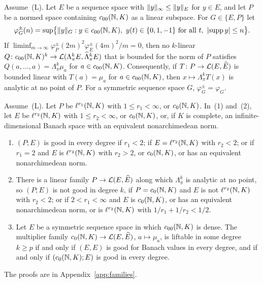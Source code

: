 \begin{theorem}\label{fam2:thm:staircase}
Assume~\textup{(L)}. Let $E$ be a sequence space with $\lVert y\rVert_\infty\le\lVert y\rVert_E$ for $y\in E$, and let $P$ be a normed
space containing $c_{00}(\mathbb N,K)$ as a linear subspace. For $G\in\{E,P\}$ let
\[
 \varphi^\pm_G(n)=\sup\bigl\{\lVert y\rVert_G:y\in c_{00}(\mathbb N,K),\ y(t)\in\{0,1,-1\}\text{ for all }t,\
 \lvert \operatorname{supp}y\rvert\le n\bigr\}.
\]
If $\liminf_{m\to\infty}\varphi^\pm_P(2m)^2\varphi^\pm_E(4m)^2/m=0$, then no $k$-linear
$Q\colon c_{00}(\mathbb N,K)^k\to\mathcal L(\Lambda^k_\pi E,\widehat\Lambda^k_\pi E)$ that is bounded for the norm of $P$ satisfies
$Q(a,\dots,a)=\Lambda^k_\pi\mu_a$ for $a\in c_{00}(\mathbb N,K)$. Consequently, if $T\colon P\to\mathcal L(E,\widehat E)$ is bounded
linear with $T(a)=\mu_a$ for $a\in c_{00}(\mathbb N,K)$, then $x\mapsto\Lambda^k_\pi T(x)$ is analytic at no point of $P$. For a
symmetric sequence space $G$, $\varphi^\pm_G=\varphi_G$.
\end{theorem}

\begin{corollary}\label{fam2:cor:table}
Assume~\textup{(L)}. Let $P$ be $\ell^{r_1}(\mathbb N,K)$ with $1\le r_1<\infty$, or $c_0(\mathbb N,K)$. In~(1) and~(2), let $E$ be
$\ell^{r_2}(\mathbb N,K)$ with $1\le r_2<\infty$, or $c_0(\mathbb N,K)$, or, if $K$ is complete, an infinite-dimensional Banach space with
an equivalent nonarchimedean norm.
\begin{enumerate}
\item $(P;E)$ is good in every degree if $r_1<2$; if $E=\ell^{r_2}(\mathbb N,K)$ with $r_2<2$; or if $r_1=2$ and $E$ is
$\ell^{r_2}(\mathbb N,K)$ with $r_2>2$, or $c_0(\mathbb N,K)$, or has an equivalent nonarchimedean norm.
\item There is a linear family $P\to\mathcal L(E,\widehat E)$ along which $\Lambda^k_\pi$ is analytic at no point, so $(P;E)$ is
not good in degree $k$, if $P=c_0(\mathbb N,K)$ and $E$ is not $\ell^{r_2}(\mathbb N,K)$ with $r_2<2$; or if $2<r_1<\infty$ and $E$ is
$c_0(\mathbb N,K)$, or has an equivalent nonarchimedean norm, or is $\ell^{r_2}(\mathbb N,K)$ with $1/r_1+1/r_2<1/2$.
\item Let $E$ be a symmetric sequence space in which $c_{00}(\mathbb N,K)$ is dense. The multiplier family
$c_0(\mathbb N,K)\to\mathcal L(E,\widehat E)$, $a\mapsto\mu_a$, is liftable in some degree $k\ge p$ if and only if $(E,E)$ is good for
Banach values in every degree, and if and only if $(c_0(\mathbb N,K);E)$ is good in every degree.
\end{enumerate}
\end{corollary}

The proofs are in Appendix~\ref{app:families}.

